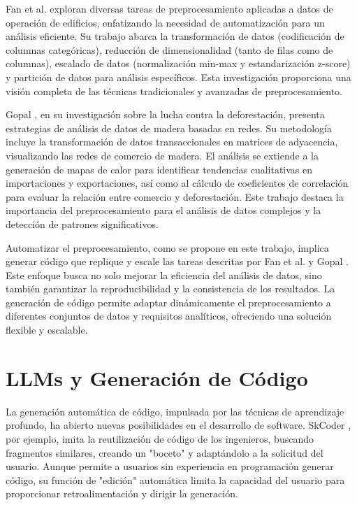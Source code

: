 Fan et al. \cite{fan} exploran diversas tareas de preprocesamiento aplicadas a datos de operación de edificios, enfatizando la necesidad de automatización para un análisis eficiente. Su trabajo abarca la transformación de datos (codificación de columnas categóricas), reducción de dimensionalidad (tanto de filas como de columnas), escalado de datos (normalización min-max y estandarización z-score) y partición de datos para análisis específicos. Esta investigación proporciona una visión completa de las técnicas tradicionales y avanzadas de preprocesamiento.

Gopal \cite{gopal}, en su investigación sobre la lucha contra la deforestación, presenta estrategias de análisis de datos de madera basadas en redes. Su metodología incluye la transformación de datos transaccionales en matrices de adyacencia, visualizando las redes de comercio de madera. El análisis se extiende a la generación de mapas de calor para identificar tendencias cualitativas en importaciones y exportaciones, así como al cálculo de coeficientes de correlación para evaluar la relación entre comercio y deforestación. Este trabajo destaca la importancia del preprocesamiento para el análisis de datos complejos y la detección de patrones significativos.

Automatizar el preprocesamiento, como se propone en este trabajo, implica generar código que replique y escale las tareas descritas por Fan et al. \cite{fan} y Gopal \cite{gopal}. Este enfoque busca no solo mejorar la eficiencia del análisis de datos, sino también garantizar la reproducibilidad y la consistencia de los resultados. La generación de código permite adaptar dinámicamente el preprocesamiento a diferentes conjuntos de datos y requisitos analíticos, ofreciendo una solución flexible y escalable.


\section{LLMs y Generación de Código}

La generación automática de código, impulsada por las técnicas de aprendizaje profundo, ha abierto nuevas posibilidades en el desarrollo de software. SkCoder \cite{skcoder}, por ejemplo, imita la reutilización de código de los ingenieros, buscando fragmentos similares, creando un "boceto" y adaptándolo a la solicitud del usuario. Aunque permite a usuarios sin experiencia en programación generar código, su función de "edición" automática limita la capacidad del usuario para proporcionar retroalimentación y dirigir la generación.

